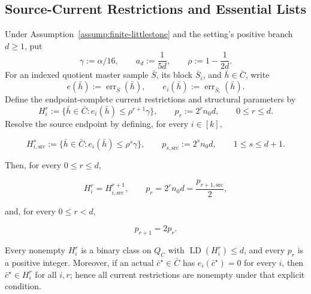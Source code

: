 \subsection{Source-Current Restrictions and Essential Lists}\label{app:step_008}


\begin{lemma}\label{lem:step-008-stage-map}
Under Assumption~\ref{assump:finite-littlestone} and the setting's
positive branch \(d\ge1\), put
\[
 \gamma:=\alpha/16,\qquad
 a_d:=\frac{1}{5d},\qquad
 \rho:=1-\frac{1}{2d}.
\tag{1}
\]
For an indexed quotient master sample \(\bar S\), its block
\(\bar S_i\), and \(\bar h\in\bar C\), write
\[
 e(\bar h):=\operatorname{err}_{\bar S}(\bar h),
 \qquad
 e_i(\bar h):=\operatorname{err}_{\bar S_i}(\bar h).
\tag{2}
\]
Define the endpoint-complete current restrictions and structural parameters by
\[
 H_i^r:=\{\bar h\in\bar C:e_i(\bar h)\leq
                  \rho^{r+1}\gamma\},
 \qquad
 p_r:=2^r n_0d,
 \qquad 0\leq r\leq d.
\tag{3}
\]
Resolve the source endpoint by defining, for every \(i\in[k]\),

\[
 H_{i,\mathrm{src}}^s
 :=\{\bar h\in\bar C:e_i(\bar h)\le\rho^s\gamma\},
 \qquad
 p_{s,\mathrm{src}}:=2^s n_0d,
 \qquad 1\le s\le d+1.
\tag{14}
\]

Then, for every \(0\le r\le d\),

\[
 H_i^r=H_{i,\mathrm{src}}^{r+1},
 \qquad
 p_r=2^rn_0d=\frac{p_{r+1,\mathrm{src}}}{2},
\tag{15}
\]

and, for every \(0\le r<d\),

\[
 p_{r+1}=2p_r.
\tag{16}
\]

Every nonempty \(H_i^r\) is a binary class on \(Q_C\) with
\(\operatorname{LD}(H_i^r)\le d\), and every \(p_r\) is a positive integer.
Moreover, if an actual \(\bar c^\star\in\bar C\) has
\(e_i(\bar c^\star)=0\) for every \(i\), then
\(\bar c^\star\in H_i^r\) for all \(i,r\); hence all current restrictions
are nonempty under that explicit condition.


\end{lemma}

